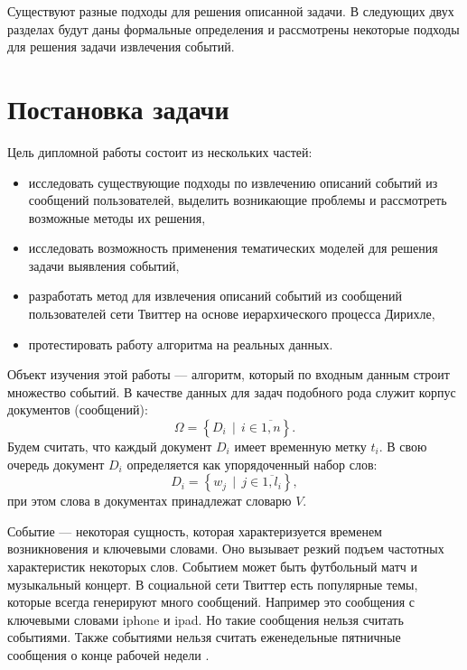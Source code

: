\documentclass[14pt,a4paper,oneside]{extarticle}
\DeclareMathOperator{\svert}{\,\vert\,}
\begin{document}
	Существуют разные подходы для решения описанной задачи. В следующих двух разделах будут даны формальные определения и рассмотрены некоторые подходы для решения задачи извлечения событий.
	
  \section{Постановка задачи}
	Цель дипломной работы состоит из нескольких частей:
\begin{itemize}
\item исследовать существующие подходы по извлечению описаний событий из сообщений пользователей, выделить возникающие проблемы и рассмотреть возможные методы их решения,
\item исследовать возможность применения тематических моделей для решения задачи выявления событий,
\item разработать метод для извлечения описаний событий из сообщений пользователей сети Твиттер на основе иерархического процесса Дирихле,
\item протестировать работу алгоритма на реальных данных.
\end{itemize}	  
  
  Объект изучения этой работы --- алгоритм, который по входным данным строит множество событий. В качестве данных для задач подобного рода служит корпус документов (сообщений):
\begin{equation}
  \Omega = \left\{D_i \svert i \in \overline{1,n} \right\}.
  \end{equation}  
  Будем считать, что каждый документ $D_i$ имеет временную метку $t_i$. В свою очередь документ $D_i$ определяется как упорядоченный набор слов:
\begin{equation}
  D_i = \left\{w_j \svert j \in \overline{ 1, l_i } \right\},
  \end{equation}  
   при этом слова в документах принадлежат словарю $V$. 
  
  Событие --- некоторая сущность, которая характеризуется временем возникновения и ключевыми словами. Оно вызывает резкий подъем частотных характеристик некоторых слов. Событием может быть футбольный матч и музыкальный концерт. В социальной сети Твиттер есть популярные темы, которые всегда генерируют много сообщений. Например это сообщения с ключевыми словами iphone и ipad. Но такие сообщения нельзя считать событиями. Также событиями нельзя считать еженедельные пятничные сообщения о конце рабочей недели \cite{waim13}.
  
\end{document}

